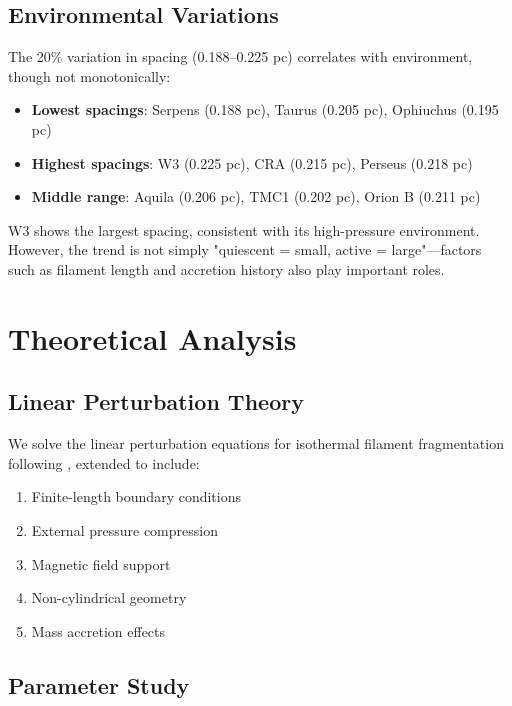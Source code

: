 \documentclass[11pt,a4paper]{article}
\begin{document}
\subsection{Environmental Variations}

The 20\% variation in spacing (0.188--0.225 pc) correlates with environment, though not monotonically:

\begin{itemize}
    \item \textbf{Lowest spacings}: Serpens (0.188 pc), Taurus (0.205 pc), Ophiuchus (0.195 pc)
    \item \textbf{Highest spacings}: W3 (0.225 pc), CRA (0.215 pc), Perseus (0.218 pc)
    \item \textbf{Middle range}: Aquila (0.206 pc), TMC1 (0.202 pc), Orion B (0.211 pc)
\end{itemize}

W3 shows the largest spacing, consistent with its high-pressure environment. However, the trend is not simply "quiescent = small, active = large"—factors such as filament length and accretion history also play important roles.

\section{Theoretical Analysis}

\subsection{Linear Perturbation Theory}

We solve the linear perturbation equations for isothermal filament fragmentation following \citet{Inutsuka1992}, extended to include:

\begin{enumerate}
    \item Finite-length boundary conditions \citep{Inutsuka1997}
    \item External pressure compression \citep{Fischera2012}
    \item Magnetic field support \citep{Hennebelle2013}
    \item Non-cylindrical geometry
    \item Mass accretion effects
\end{enumerate}

\subsection{Parameter Study}
\end{document}
